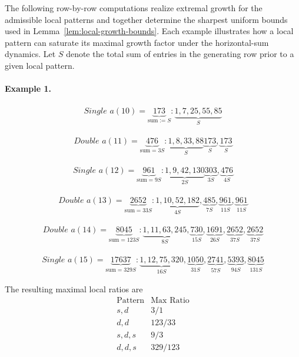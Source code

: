 \documentclass[12pt, oneside]{article}   	%
\numberwithin{equation}{section}          %
\theoremstyle{definition}
\begin{document}
The following row-by-row computations realize extremal growth for the admissible
local patterns and together determine the sharpest uniform bounds used in
Lemma~\ref{lem:local-growth-bounds}.  Each example illustrates how a local pattern
can saturate its maximal growth factor under the horizontal-sum dynamics.  Let $S$
denote the total sum of entries in the generating row prior to a given local pattern.

\paragraph{Example 1.}
\[
\begin{array}{l}
\textit{Single } a(10) = \underbrace{173}_{\text{sum} := S}:
\underbrace{1,7,25,55,85}_{S}
\end{array}
\]

\[
\begin{array}{l}
\textit{Double } a(11) = \underbrace{476}_{\text{sum} = 3S}:
\underbrace{1,8,33,88}_{S}
\underbrace{173}_{S},
\underbrace{173}_{S}
\end{array}
\]

\[
\begin{array}{l}
\textit{Single } a(12) = \underbrace{961}_{\text{sum} = 9S}:
\underbrace{1,9,42,130}_{2S}
\underbrace{303}_{3S},
\underbrace{476}_{4S}
\end{array}
\]

\[
\begin{array}{l}
\textit{Double } a(13) = \underbrace{2652}_{\text{sum} = 33S}:
\underbrace{1,10,52,182}_{4S},
\underbrace{485}_{7S},
\underbrace{961}_{11S},
\underbrace{961}_{11S}
\end{array}
\]

\[
\begin{array}{l}
\textit{Double } a(14) = \underbrace{8045}_{\text{sum} = 123S}:
\underbrace{1,11,63,245}_{8S},
\underbrace{730}_{15S},
\underbrace{1691}_{26S},
\underbrace{2652}_{37S},
\underbrace{2652}_{37S}
\end{array}
\]

\[
\begin{array}{l}
\textit{Single } a(15) = \underbrace{17637}_{\text{sum} = 329S}:
\underbrace{1,12,75,320}_{16S},
\underbrace{1050}_{31S},
\underbrace{2741}_{57S},
\underbrace{5393}_{94S},
\underbrace{8045}_{131S}
\end{array}
\]

The resulting maximal local ratios are
\[
\begin{array}{c|c}
\text{Pattern} & \text{Max Ratio} \\
\hline
s,d & 3/1 \\
d,d & 123/33 \\
s,d,s & 9/3 \\
d,d,s & 329/123
\end{array}
\]
\end{document}

